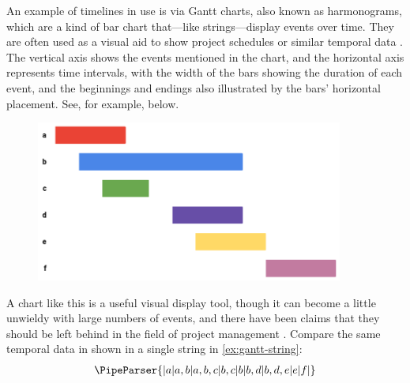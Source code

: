 \documentclass[a4paper,12pt,leqno,twoside]{article}
\newcommand{\vph}[1]{\vphantom{#1}}
\newcommand{\ebox}[1]{\fbox{$\vph{'(),}#1$}}
\newcommand{\EventString}[1]{%
	\renewcommand*{\do}[1]{\ebox{##1}}%
	\PipeParser{#1}%
}
\begin{document}
An example of timelines in use is via Gantt charts, also known as harmonograms, which are a kind of bar chart that---like strings---display events over time. They are often used as a visual aid to show project schedules or similar temporal data \citep{kumar2005effective}. %
The vertical axis shows the events mentioned in the chart, and the horizontal axis represents time intervals, with the width of the bars showing the duration of each event, and the beginnings and endings also illustrated by the bars' horizontal placement. See, for example,  below.

\begin{center}
	\begin{figure}[h!]
		\centering
		\includegraphics[width=0.9\textwidth]{images/gantt-chart-example.png}
		\label{ex:gantt-chart}
	\end{figure}
\end{center}
A chart like this is a useful visual display tool, though it can become a little unwieldy with large numbers of events, and there have been claims that they should be left behind in the field of project management \citep{maylor2001beyond}. Compare the same temporal data in  shown in a single string in \cref{ex:gantt-string}:
\begin{align}\label{ex:gantt-string}
	\EventString{{}|a|a,b|a,b,c|b,c|b|b,d|b,d,e|e|f|{}}
\end{align}
\end{document}
